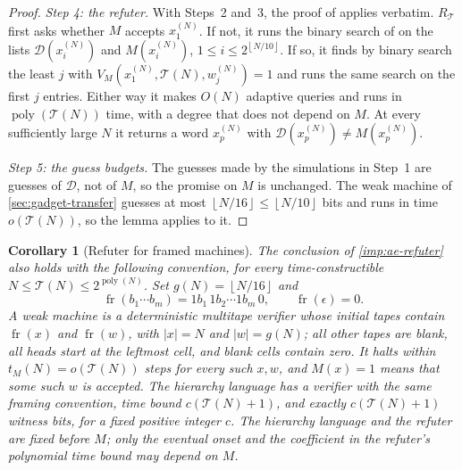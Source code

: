 \documentclass[11pt,letterpaper]{article}
\newtheorem{corollary}[theorem]{Corollary}
\theoremstyle{definition}
\theoremstyle{remark}
\newcommand{\poly}{\operatorname{poly}}
\newcommand{\floor}[1]{\left\lfloor #1\right\rfloor}
\newcommand{\abs}[1]{\left|#1\right|}
\newcommand{\Tclk}{\mathcal T}
\begin{document}
\begin{proof}
\emph{Step 4: the refuter.} With Steps~2 and~3, the proof of
\cite[Theorem~4.6]{CLW20} applies verbatim. \(R_{\Tclk}\) first asks
whether \(M\) accepts \(x^{(N)}_1\). If not, it runs the binary search of
\cite[Corollary~4.5]{CLW20} on the lists \(\mathcal D(x^{(N)}_i)\) and
\(M(x^{(N)}_i)\), \(1\le i\le2^{\floor{N/10}}\). If so, it finds by
binary search the least \(j\) with \(V_M(x^{(N)}_1,\Tclk(N),w^{(N)}_j)=1\)
and runs the same search on the first \(j\) entries. Either way it makes
\(O(N)\) adaptive queries and runs in \(\poly(\Tclk(N))\) time, with a
degree that does not depend on \(M\). At every sufficiently large \(N\) it
returns a word \(x^{(N)}_p\) with \(\mathcal D(x^{(N)}_p)\ne M(x^{(N)}_p)\).

\emph{Step 5: the guess budgets.} The guesses made by the simulations in
Step~1 are guesses of \(\mathcal D\), not of \(M\), so the promise on \(M\)
is unchanged. The weak machine of
\cref{sec:gadget-transfer} guesses at most
\(\floor{N/16}\le\floor{N/10}\) bits and runs in time \(o(\Tclk(N))\), so
the lemma applies to it.
\end{proof}

\begin{corollary}[Refuter for framed machines]\label{cor:framed-refuter}
The conclusion of \cref{imp:ae-refuter} also holds with the following
convention, for every time-constructible
\(N\le\Tclk(N)\le2^{\poly(N)}\). Set \(g(N)=\floor{N/16}\) and
\[
 \operatorname{fr}(b_1\cdots b_m)=1b_1\,1b_2\cdots1b_m\,0,
 \qquad \operatorname{fr}(\epsilon)=0.
\]
A weak machine is a deterministic multitape verifier whose initial
tapes contain \(\operatorname{fr}(x)\) and
\(\operatorname{fr}(w)\), with \(\abs x=N\) and \(\abs w=g(N)\);
all other tapes are blank, all heads start at the leftmost cell, and
blank cells contain zero. It halts within \(t_M(N)=o(\Tclk(N))\)
steps for every such \(x,w\), and \(M(x)=1\) means that some such
\(w\) is accepted. The hierarchy language has a verifier with the
same framing convention, time bound \(c(\Tclk(N)+1)\), and exactly
\(c(\Tclk(N)+1)\) witness bits, for a fixed positive integer \(c\).
The hierarchy language and the refuter are fixed before \(M\); only
the eventual onset and the coefficient in the refuter's polynomial
time bound may depend on \(M\).
\end{corollary}
\end{document}
